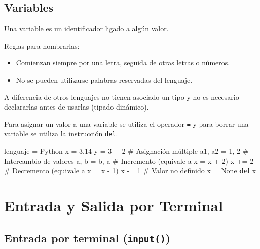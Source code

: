\documentclass[
  spanish,
  a4paper,
]{scrreport}
\newenvironment{Shaded}{\begin{snugshade}}{\end{snugshade}}
\newcommand{\CommentTok}[1]{\textcolor[rgb]{0.37,0.37,0.37}{#1}}
\newcommand{\DecValTok}[1]{\textcolor[rgb]{0.68,0.00,0.00}{#1}}
\newcommand{\FloatTok}[1]{\textcolor[rgb]{0.68,0.00,0.00}{#1}}
\newcommand{\KeywordTok}[1]{\textcolor[rgb]{0.00,0.23,0.31}{\textbf{#1}}}
\newcommand{\NormalTok}[1]{\textcolor[rgb]{0.00,0.23,0.31}{#1}}
\newcommand{\OperatorTok}[1]{\textcolor[rgb]{0.37,0.37,0.37}{#1}}
\newcommand{\StringTok}[1]{\textcolor[rgb]{0.13,0.47,0.30}{#1}}
\newcommand{\VariableTok}[1]{\textcolor[rgb]{0.07,0.07,0.07}{#1}}
\providecommand{\tightlist}{%
  \setlength{\itemsep}{0pt}\setlength{\parskip}{0pt}}
\begin{document}
\section{Variables}\label{variables}

Una variable es un identificador ligado a algún valor.

Reglas para nombrarlas:

\begin{itemize}
\tightlist
\item
  Comienzan siempre por una letra, seguida de otras letras o números.
\item
  No se pueden utilizarse palabras reservadas del lenguaje.
\end{itemize}

A diferencia de otros lenguajes no tienen asociado un tipo y no es
necesario declararlas antes de usarlas (tipado dinámico).

Para asignar un valor a una variable se utiliza el operador \texttt{=} y
para borrar una variable se utiliza la instrucción \texttt{del}.

\begin{Shaded}
\begin{Highlighting}[]
\NormalTok{lenguaje }\OperatorTok{=} \StringTok{\textquotesingle{}Python\textquotesingle{}}
\NormalTok{x }\OperatorTok{=} \FloatTok{3.14}
\NormalTok{y }\OperatorTok{=} \DecValTok{3} \OperatorTok{+} \DecValTok{2}
\CommentTok{\# Asignación múltiple}
\NormalTok{a1, a2 }\OperatorTok{=} \DecValTok{1}\NormalTok{, }\DecValTok{2}
\CommentTok{\# Intercambio de valores}
\NormalTok{a, b }\OperatorTok{=}\NormalTok{ b, a}
\CommentTok{\# Incremento (equivale a x = x + 2)}
\NormalTok{x }\OperatorTok{+=} \DecValTok{2}
\CommentTok{\# Decremento (equivale a x = x {-} 1)}
\NormalTok{x }\OperatorTok{{-}=} \DecValTok{1}
\CommentTok{\# Valor no definido}
\NormalTok{x }\OperatorTok{=} \VariableTok{None}
\KeywordTok{del}\NormalTok{ x}
\end{Highlighting}
\end{Shaded}


\chapter{Entrada y Salida por
Terminal}\label{entrada-y-salida-por-terminal}

\section{\texorpdfstring{Entrada por terminal
(\texttt{input()})}{Entrada por terminal (input())}}\label{entrada-por-terminal-input}
\end{document}
